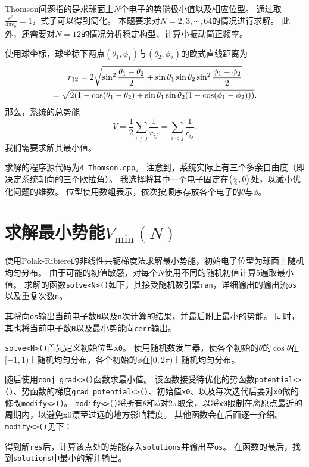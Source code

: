 Thomson问题指的是求球面上$N$个电子的势能极小值以及相应位型。
通过取$\frac{e^2}{4\pi\epsilon_0} = 1$，式子可以得到简化。
本题要求对$N = 2, 3, \cdots, 64$的情况进行求解。
此外，还需要对$N = 12$的情况分析稳定构型、计算小振动简正频率。

使用球坐标，球坐标下两点$(\theta_1, \phi_1)$与$(\theta_2, \phi_2)$的欧式直线距离为
\begin{multline}
    r_{12} = 2\sqrt{\sin^2{\frac{\theta_1 - \theta_2}{2}} + \sin{\theta_1}\sin{\theta_2}\sin^2{\frac{\phi_1 - \phi_2}{2}}}\\
    = \sqrt{2\qty(1-\cos(\theta_1 - \theta_2) + \sin{\theta_1}\sin{\theta_2}(1-\cos(\phi_1 - \phi_2)))}.
\end{multline}
那么，系统的总势能
\begin{equation}
    V = \frac{1}{2}\sum_{i\neq j}\frac{1}{r_{ij}} = \sum_{i < j}\frac{1}{r_{ij}}.
\end{equation}
我们需要求解其最小值。

求解的程序源代码为\texttt{4\_Thomson.cpp}。
注意到，系统实际上有三个多余自由度（即决定系统朝向的三个欧拉角）。
我选择将其中一个电子固定在$\qty(\frac{\pi}{2}, 0)$处，以减小优化问题的维数。
位型使用数组表示，依次按顺序存放各个电子的$\theta$与$\phi$。

\section{求解最小势能\texorpdfstring{$V_\text{min}(N)$}{Vmin(N)}}
使用Polak-Ribiere的非线性共轭梯度法求解最小势能，初始电子位型为球面上随机均匀分布。
由于可能的初值敏感，对每个$N$使用不同的随机初值计算5遍取最小值。
求解的函数\texttt{solve<N>()}如下，其接受随机数引擎\texttt{ran}，详细输出的输出流\texttt{os}以及重复次数\texttt{n}。
{
    \linespread{1.0}
    
}
其将向\texttt{os}输出当前电子数\texttt{N}以及\texttt{n}次计算的结果，并最后附上最小的势能。
同时，其也将当前电子数\texttt{N}以及最小势能向\texttt{cerr}输出。

\texttt{solve<N>()}首先定义初始位型\texttt{x0}。
使用随机数发生器，使各个初始的$\theta$的$\cos{\theta}$在$[-1, 1)$上随机均匀分布，各个初始的$\phi$在$[0, 2\pi)$上随机均匀分布。

随后使用\texttt{conj\_grad<>()}函数求最小值。
该函数接受待优化的势函数\texttt{potential<>()}、势函数的梯度\texttt{grad\_potential<>()}、初始值\texttt{x0}、以及每次迭代后要对\texttt{x0}做的修改\texttt{modify<>()}。
\texttt{modify<>()}将所有$\theta$和$\phi$对$2\pi$取余，以将\texttt{x0}限制在离原点最近的周期内，以避免x0漂至过远的地方影响精度。
其他函数会在后面逐一介绍。
\texttt{modify<>()}见下：
{
    \linespread{1.0}
    
}
得到解\texttt{res}后，计算该点处的势能存入\texttt{solutions}并输出至\texttt{os}。
在函数的最后，找到\texttt{solutions}中最小的解并输出。

